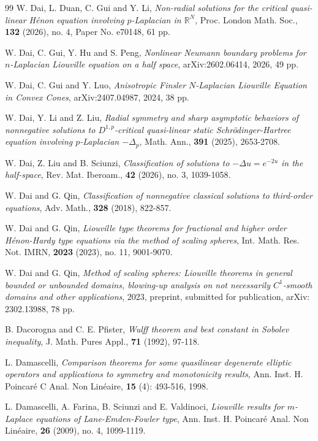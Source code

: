 \documentclass[12pt]{amsart}
\theoremstyle{definition}
\theoremstyle{remark}
\theoremstyle{conclusion}
\theoremstyle{conjecture}
\numberwithin{equation}{section}
\begin{document}
\begin{thebibliography}{99}
 W. Dai, L. Duan, C. Gui and Y. Li, {\it Non-radial solutions for the critical quasi-linear H\'{e}non equation involving $p$-Laplacian in $\mathbb{R}^N$}, Proc. London Math. Soc., \textbf{132} (2026), no. 4, Paper No. e70148, 61 pp.

 W. Dai, C. Gui, Y. Hu and S. Peng, {\it Nonlinear Neumann boundary problems for $n$-Laplacian Liouville equation on a half space}, arXiv:2602.06414, 2026, 49 pp.

 W. Dai, C. Gui and Y. Luo, {\it Anisotropic Finsler $N$-Laplacian Liouville Equation in Convex Cones}, arXiv:2407.04987, 2024, 38 pp.

 W. Dai, Y. Li and Z. Liu, {\it Radial symmetry and sharp asymptotic behaviors of nonnegative solutions to $D^{1,p}$-critical quasi-linear static Schr\"{o}dinger-Hartree equation involving $p$-Laplacian $-\Delta_{p}$}, Math. Ann., \textbf{391} (2025), 2653-2708.

 W. Dai, Z. Liu and B. Sciunzi, {\it Classification of solutions to $-\Delta u=e^{-2u}$ in the half-space}, Rev. Mat. Iberoam., \textbf{42} (2026), no. 3, 1039-1058.

 W. Dai and G. Qin, {\it Classification of nonnegative classical solutions to third-order equations}, Adv. Math., \textbf{328} (2018), 822-857.

 W. Dai and G. Qin, {\it Liouville type theorems for fractional and higher order H\'{e}non-Hardy type equations via the method of scaling spheres}, Int. Math. Res. Not. IMRN, \textbf{2023} (2023), no. 11, 9001-9070.
    
 W. Dai and G. Qin, {\it Method of scaling spheres: Liouville theorems in general bounded or unbounded domains, blowing-up analysis on not necessarily $C^1$-smooth domains and other applications}, 2023, preprint, submitted for publication, arXiv: 2302.13988, 78 pp.

 B. Dacorogna and C. E. Pfister, {\it Wulff theorem and best constant in Sobolev inequality}, J. Math. Pures Appl., \textbf{71} (1992), 97-118.

 L. Damascelli, {\it Comparison theorems for some quasilinear degenerate elliptic operators and applications to symmetry and monotonicity results}, Ann. Inst. H. Poincar\'{e} C Anal. Non Lin\'{e}aire, \textbf{15} (4): 493-516, 1998.

 L. Damascelli, A. Farina, B. Sciunzi and E. Valdinoci, {\it Liouville results for $m$-Laplace equations of Lane-Emden-Fowler type}, Ann. Inst. H. Poincar\'{e} Anal. Non Lin\'{e}aire, \textbf{26} (2009), no. 4, 1099-1119.


\end{thebibliography}
\end{document}
